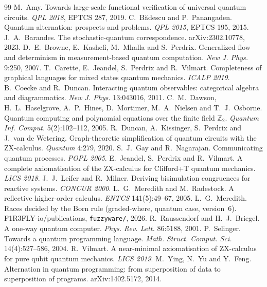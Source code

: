 \documentclass[11pt,a4paper]{article}
\theoremstyle{plain}
\theoremstyle{definition}
\theoremstyle{remark}
\begin{document}
\begin{thebibliography}{99}
 M.~Amy. Towards large-scale functional verification of universal
  quantum circuits. \emph{QPL 2018}, EPTCS 287, 2019.
 C.~B\u{a}descu and P.~Panangaden. Quantum alternation: prospects
  and problems. \emph{QPL 2015}, EPTCS 195, 2015.
 J.~A.~Barandes. The stochastic-quantum correspondence.
  arXiv:2302.10778, 2023.
 D.~E.~Browne, E.~Kashefi, M.~Mhalla and S.~Perdrix. Generalized
  flow and determinism in measurement-based quantum computation. \emph{New J.
  Phys.} 9:250, 2007.
 T.~Carette, E.~Jeandel, S.~Perdrix and R.~Vilmart. Completeness
  of graphical languages for mixed states quantum mechanics. \emph{ICALP 2019}.
 B.~Coecke and R.~Duncan. Interacting quantum
  observables: categorical algebra and diagrammatics. \emph{New J. Phys.}
  13:043016, 2011.
 C.~M.~Dawson, H.~L.~Haselgrove, A.~P.~Hines, D.~Mortimer,
  M.~A.~Nielsen and T.~J.~Osborne. Quantum computing and polynomial equations
  over the finite field $\mathbb{Z}_2$. \emph{Quantum Inf. Comput.}
  5(2):102--112, 2005.
 R.~Duncan, A.~Kissinger, S.~Perdrix and J.~van de Wetering.
  Graph-theoretic simplification of quantum circuits with the ZX-calculus.
  \emph{Quantum} 4:279, 2020.
 S.~J.~Gay and R.~Nagarajan. Communicating quantum processes.
  \emph{POPL 2005}.
 E.~Jeandel, S.~Perdrix and R.~Vilmart. A complete axiomatisation
  of the ZX-calculus for Clifford+T quantum mechanics. \emph{LICS 2018}.
 J.~J.~Leifer and R.~Milner. Deriving bisimulation
  congruences for reactive systems. \emph{CONCUR 2000}.
 L.~G.~Meredith and M.~Radestock. A reflective higher-order
  calculus. \emph{ENTCS} 141(5):49--67, 2005.
 L.~G.~Meredith. Races decided by the Born rule (graded-where,
  quantum case, version~6). F1R3FLY-io/publications, \texttt{fuzzyware/}, 2026.
 R.~Raussendorf and H.~J.~Briegel. A one-way quantum computer.
  \emph{Phys. Rev. Lett.} 86:5188, 2001.
 P.~Selinger. Towards a quantum programming language.
  \emph{Math. Struct. Comput. Sci.} 14(4):527--586, 2004.
 R.~Vilmart. A near-minimal axiomatisation of ZX-calculus for
  pure qubit quantum mechanics. \emph{LICS 2019}.
 M.~Ying, N.~Yu and Y.~Feng. Alternation in quantum programming:
  from superposition of data to superposition of programs. arXiv:1402.5172,
  2014.
\end{thebibliography}
\end{document}
